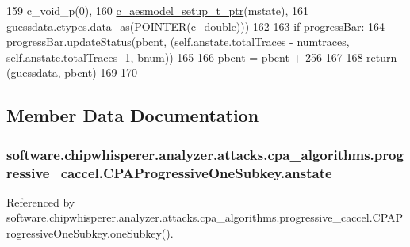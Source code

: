 \begin{DoxyCode}
159                  c\_void\_p(0),
160                 \hyperlink{namespacesoftware_1_1chipwhisperer_1_1analyzer_1_1attacks_1_1cpa__algorithms_1_1progressive__caccel_a5ac392b22526a6a9379e8b8be3d11347}{c\_aesmodel\_setup\_t\_ptr}(mstate),
161                  guessdata.ctypes.data\_as(POINTER(c\_double)))
162       
163         \textcolor{keywordflow}{if} progressBar:
164             progressBar.updateStatus(pbcnt, (self.anstate.totalTraces - numtraces, self.anstate.totalTraces
      -1, bnum))
165 
166         pbcnt = pbcnt + 256
167 
168         \textcolor{keywordflow}{return} (guessdata, pbcnt)
169 
170 
\end{DoxyCode}


\subsection{Member Data Documentation}
\hypertarget{classsoftware_1_1chipwhisperer_1_1analyzer_1_1attacks_1_1cpa__algorithms_1_1progressive__caccel_1_1CPAProgressiveOneSubkey_abc94b14ea5f680c42544cc571fa392ae}{}
\subsubsection[{anstate}]{\setlength{\rightskip}{0pt plus 5cm}software.\+chipwhisperer.\+analyzer.\+attacks.\+cpa\+\_\+algorithms.\+progressive\+\_\+caccel.\+C\+P\+A\+Progressive\+One\+Subkey.\+anstate}\label{classsoftware_1_1chipwhisperer_1_1analyzer_1_1attacks_1_1cpa__algorithms_1_1progressive__caccel_1_1CPAProgressiveOneSubkey_abc94b14ea5f680c42544cc571fa392ae}


Referenced by software.\+chipwhisperer.\+analyzer.\+attacks.\+cpa\+\_\+algorithms.\+progressive\+\_\+caccel.\+C\+P\+A\+Progressive\+One\+Subkey.\+one\+Subkey().

\hypertarget{classsoftware_1_1chipwhisperer_1_1analyzer_1_1attacks_1_1cpa__algorithms_1_1progressive__caccel_1_1CPAProgressiveOneSubkey_ad6062fd8c82b37a9b006fcb6f3b589a6}{}
